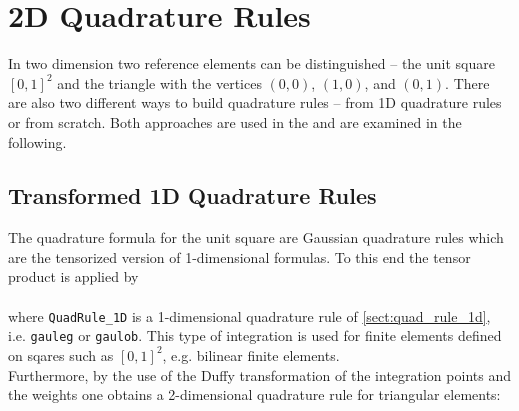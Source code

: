 




\section{2D Quadrature Rules} \label{sect:quad_rule_2d} 

 In two dimension two reference elements can be distinguished -- the unit square $[0,1]^2$ and the triangle with the vertices $(0,0)$, $(1,0)$, and $(0,1)$. There are also two different ways to build quadrature rules -- from 1D quadrature rules or from scratch. Both approaches are used in the \LIBNAME and are examined in the following.

\subsection{Transformed 1D Quadrature Rules} \label{ssect:quad_trans} 

 The quadrature formula for the unit square are Gaussian quadrature rules which are the tensorized version of 1-dimensional formulas. To this end the tensor product  is applied by \\

 \\

 where {\tt QuadRule\_1D} is a 1-dimensional quadrature rule of \ref{sect:quad_rule_1d}, i.e. {\tt gauleg} or {\tt gaulob}. This type of integration is used for finite elements defined on sqares such as $[0,1]^2$, e.g. bilinear finite elements. \\


 Furthermore, by the use of the Duffy transformation  of the integration points and the weights one obtains a 2-dimensional quadrature rule for triangular elements: \\

